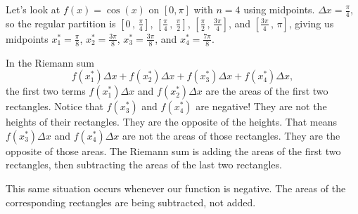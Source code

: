\documentclass{ximera}
\begin{document}
Let's look at $f(x) = \cos(x)$ on $[0, \pi]$ with $n=4$ using midpoints.
$\Delta x = \frac{\pi}{4}$, so the regular partition is $\left[ 0 \, , \, \frac{\pi}{4} \right]$, $\left[ \frac{\pi}{4} \, , \, \frac{\pi}{2} \right]$, $\left[ \frac{\pi}{2} \, , \, \frac{3\pi}{4} \right]$, and 
$\left[ \frac{3\pi}{4} \, , \, \pi \right]$, giving us midpoints $x_1^* = \frac{\pi}{8}$, $x_2^* = \frac{3\pi}{8}$, $x_3^* = \frac{3\pi}{8}$, and $x_4^*=\frac{7\pi}{8}$.
\begin{image}
\end{image}

In the Riemann sum
\[ f(x_1^*)\Delta x + f(x_2^*)\Delta x + f(x_3^*)\Delta x + f(x_4^*)\Delta x, \]
the first two terms $f(x_1^*)\Delta x$ and $f(x_2^*)\Delta x$ are the areas of the first two rectangles.
Notice that $f(x_3^*)$ and $f(x_4^*)$ are negative!  They are not the heights of their rectangles.  They
are the opposite of the heights.  That means $f(x_3^*)\Delta x$ and $f(x_4^*)\Delta x$ are not the areas of those rectangles.  
They are the opposite of those areas.  The Riemann sum is adding the areas of the first two rectangles, then subtracting the
areas of the last two rectangles.

This same situation occurs whenever our function is negative.  The areas of the corresponding rectangles are being subtracted, not added.
\end{document}
